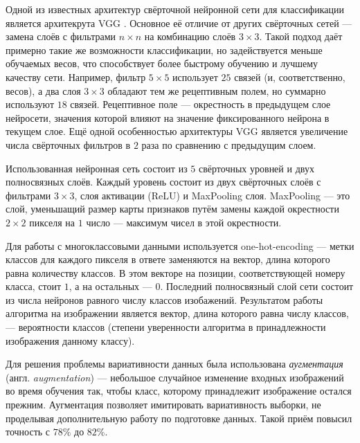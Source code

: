 Одной из известных архитектур свёрточной нейронной сети для классификации
является архитекрута VGG \cite{vgg}. Основное её отличие от других свёрточных сетей ---
замена слоёв с фильтрами $n \times n$ на комбинацию слоёв $3 \times 3$. Такой
подход даёт примерно такие же возможности классификации, но задействуется меньше
обучаемых весов, что способствует более быстрому обучению и лучшему качеству
сети. Например, фильтр $5 \times 5$ использует $25$ связей (и, соответственно,
весов), а два слоя $3 \times 3$ обладают тем же рецептивным полем, но суммарно
используют $18$ связей.
Рецептивное поле --- окрестность в предыдущем слое
нейросети, значения которой влияют на значение фиксированного нейрона в текущем
слое.  Ещё одной особенностью архитектуры VGG является увеличение числа
свёрточных фильтров в $2$ раза по сравнению с предыдущим слоем.

Использованная нейронная сеть состоит из $5$ свёрточных уровней и двух
полносвязных слоёв. Каждый уровень состоит из двух свёрточных слоёв с фильтрами
$3 \times 3$, слоя активации (ReLU) и MaxPooling слоя. MaxPooling --- это слой,
уменьшащий размер карты признаков путём замены каждой окрестности $2 \times 2$
пикселя на $1$ число --- максимум чисел в этой окрестности.

Для работы с многоклассовыми данными используется one-hot-encoding --- метки
классов для каждого пикселя в ответе заменяются на вектор, длина которого
равна количеству классов. В этом векторе на позиции, соответствующей номеру
класса, стоит $1$, а на остальных --- $0$. Последний полносвязный слой сети
состоит из числа нейронов равного числу классов изобажений. Результатом работы
алгоритма на изображении является вектор, длина которого равна числу классов,
--- вероятности классов (степени уверенности алгоритма в принадлежности
изображения данному классу). 

Для решения проблемы вариативности данных была использована \textit{аугментация}
(англ.  \textit{augmentation}) --- небольшое случайное изменение входных
изображений во время обучения так, чтобы класс, которому принадлежит изображение
остался прежним. Аугментация позволяет имитировать вариативность выборки, не
проделывая дополнительную работу по подготовке данных. Такой приём повысил
точность с $78\%$ до $82\%$.
